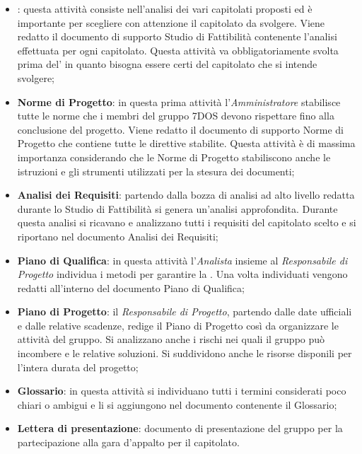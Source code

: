 \begin{itemize}

	\item \textbf{}: questa attività consiste nell'analisi dei vari capitolati proposti ed è importante per scegliere con attenzione il capitolato da svolgere. Viene redatto il documento di supporto Studio di Fattibilità contenente l'analisi effettuata per ogni capitolato. Questa attività va obbligatoriamente svolta prima del' in quanto bisogna essere certi del capitolato che si intende svolgere;

	\item \textbf{Norme di Progetto}: in questa prima attività l'\emph{Amministratore} stabilisce tutte le norme che i membri del gruppo 7DOS devono rispettare fino alla conclusione del progetto. Viene redatto il documento di supporto Norme di Progetto che contiene tutte le direttive stabilite. Questa attività è di massima importanza considerando che le Norme di Progetto stabiliscono anche le istruzioni e gli strumenti utilizzati per la stesura dei documenti;

	\item \textbf{Analisi dei Requisiti}: partendo dalla bozza di analisi ad alto livello redatta durante lo Studio di Fattibilità si genera un'analisi approfondita. Durante questa analisi si ricavano e analizzano tutti i requisiti del capitolato scelto e si riportano nel documento Analisi dei Requisiti;

	\item \textbf{Piano di Qualifica}: in questa attività l'\emph{Analista} insieme al \emph{Responsabile di Progetto} individua i metodi per garantire la . Una volta individuati vengono redatti all'interno del documento Piano di Qualifica;

	\item \textbf{Piano di Progetto}: il \emph{Responsabile di Progetto}, partendo dalle date ufficiali e dalle relative scadenze, redige il Piano di Progetto così da organizzare le attività del gruppo. Si analizzano anche i rischi nei quali il gruppo può incombere e le relative soluzioni. Si suddividono anche le risorse disponili per l'intera durata del progetto;

	\item \textbf{Glossario}: in questa attività si individuano tutti i termini considerati poco chiari o ambigui e li si aggiungono nel documento contenente il Glossario;
	
	\item \textbf{Lettera di presentazione}: documento di presentazione del gruppo per la partecipazione alla gara d'appalto per il capitolato.

\end{itemize}

